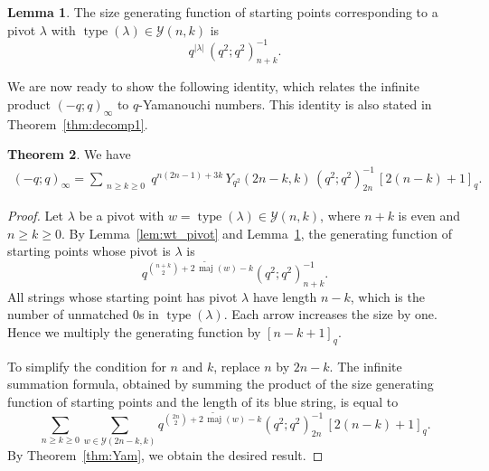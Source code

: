\documentclass[11pt]{article}
\theoremstyle{definition}
\newtheorem{theorem}{Theorem}[section]
\newtheorem{lemma}[theorem]{Lemma}
\theoremstyle{remark}
\theoremstyle{definition}
\numberwithin{equation}{section}
\newcommand{\type}{\operatorname{type}}
\begin{document}
\begin{lemma}\label{lem:gf_fixed_pivot}
  The size generating function of starting points corresponding to a
  pivot \( \lambda \) with \( \type(\lambda) \in \mathcal{Y}(n,k) \) is
  \[
    q^{|\lambda|}\,(q^2;q^2)_{n+k}^{-1}.
  \]
\end{lemma}

We are now ready to show the following identity, which relates the
infinite product \( (-q;q)_\infty \) to \( q \)-Yamanouchi numbers.
This identity is also stated in Theorem~\ref{thm:decomp1}.

\begin{theorem}\label{thm:decomp1_blue}
We have
\begin{align*}
(-q;q)_\infty = \sum_{\substack{n\geq k\geq 0}} q^{n(2n-1) + 3k}\, Y_{q^2}(2n-k,k)\,(q^2;q^2)_{2n}^{-1}\,[2(n-k)+1]_q.
\end{align*}
\end{theorem}
\begin{proof}
  Let \( \lambda \) be a pivot with
  \( w = \type(\lambda) \in \mathcal{Y}(n,k) \), where \( n+k \) is
  even and \( n \geq k \geq 0 \). By Lemma~\ref{lem:wt_pivot} and
  Lemma~\ref{lem:gf_fixed_pivot}, the generating function of starting
  points whose pivot is \( \lambda \) is
  \[
    q^{\binom{n+k}{2} + 2\, \widetilde{\operatorname{maj}}(w) -k} (q^2; q^2)_{n+k}^{-1}.
  \]
  All strings whose starting point has pivot $\lambda$ have length
  $n-k$, which is the number of unmatched $0$s in $\type(\lambda)$.
  Each arrow increases the size by one. Hence we multiply the
  generating function by $[n-k+1]_q$.

  To simplify the condition for \( n \) and \( k \), replace \( n \)
  by \( 2n-k \). The infinite summation formula, obtained by summing
  the product of the size generating function of starting points and
  the length of its blue string, is equal to
  \[
    \sum_{ n \geq k \geq 0 } \sum_{ w \in \mathcal{Y}(2n-k,k) } q^{\binom{2n}{2} + 2\, \widetilde{\operatorname{maj}}(w) - k} (q^2;q^2)_{2n}^{-1}\,[2(n-k)+1]_q.
  \]
  By Theorem~\ref{thm:Yam}, we obtain the desired result.
\end{proof}
\end{document}
